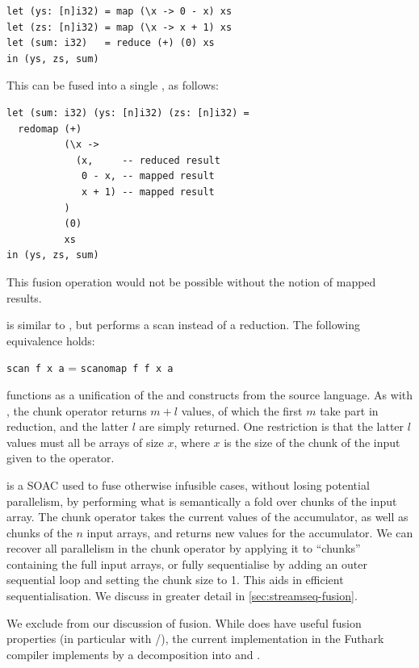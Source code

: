 \begin{description}
\begin{lstlisting}
let (ys: [n]i32) = map (\x -> 0 - x) xs
let (zs: [n]i32) = map (\x -> x + 1) xs
let (sum: i32)   = reduce (+) (0) xs
in (ys, zs, sum)
\end{lstlisting}
  This can be fused into a single , as follows:
\begin{lstlisting}
let (sum: i32) (ys: [n]i32) (zs: [n]i32) =
  redomap (+)
          (\x ->
            (x,     -- reduced result
             0 - x, -- mapped result
             x + 1) -- mapped result
          )
          (0)
          xs
in (ys, zs, sum)
\end{lstlisting}
  This fusion operation would not be possible without the notion of
  mapped results.
\item[\kw{scanomap}] is similar to , but performs a scan
  instead of a reduction.  The following equivalence holds:\\
  \centerline{\lstinline{scan f x a} = \lstinline{scanomap f f x a}}
\item[\kw{stream\_par}] functions as a unification of the
   and  constructs from the source
  language.  As with , the chunk operator returns $m+l$
  values, of which the first $m$ take part in reduction, and the
  latter $l$ are simply returned.  One restriction is that the latter
  $l$ values must all be arrays of size $x$, where $x$ is the size of
  the chunk of the input given to the operator.
\item[\kw{stream\_seq}] is a SOAC used to fuse otherwise infusible
  cases, without losing potential parallelism, by performing what is
  semantically a fold over chunks of the input array.  The chunk
  operator takes the current values of the accumulator, as well as
  chunks of the $n$ input arrays, and returns new values for the
  accumulator.  We can recover all parallelism in the chunk operator
  by applying it to ``chunks'' containing the full input arrays, or
  fully sequentialise by adding an outer sequential loop and setting
  the chunk size to 1.  This aids in efficient sequentialisation.  We
  discuss  in greater detail in
  \cref{sec:streamseq-fusion}.
\end{description}

We exclude  from our discussion of fusion.  While
 does have useful fusion properties (in particular with
/), the current implementation in the Futhark
compiler implements  by a decomposition into  and
.

